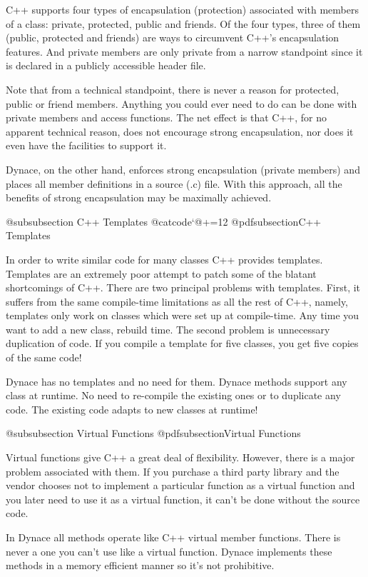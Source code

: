 C++ supports four types of encapsulation (protection) associated with
members of a class: private, protected, public and friends.  Of the
four types, three of them (public, protected and friends) are ways
to circumvent C++'s encapsulation features.  And private members are
only private from a narrow standpoint since it is declared in a
publicly accessible header file.

Note that from a technical standpoint, there is never a reason for
protected, public or friend members.  Anything you could ever need
to do can be done with private members and access functions.  The
net effect is that C++, for no apparent technical reason, does
not encourage strong encapsulation, nor does it even have the facilities
to support it.

Dynace, on the other hand, enforces strong encapsulation (private members)
and places all member definitions in a source (.c) file.  With this
approach, all the benefits of strong encapsulation may be maximally
achieved.


@subsubsection C++ Templates
{@catcode`@+=12 @pdfsubsection{C++ Templates}}

In order to write similar code for many classes C++ provides
templates.  Templates are an extremely poor attempt to patch some
of the blatant shortcomings of C++.  There are two principal problems
with templates.  First, it suffers from the same compile-time limitations
as all the rest of C++, namely, templates only work on classes which
were set up at compile-time.  Any time you want to add a new class,
rebuild time.  The second problem is unnecessary duplication of code.
If you compile a template for five classes, you get five copies of the
same code!

Dynace has no templates and no need for them.  Dynace methods support any
class at runtime.  No need to re-compile the existing ones or to
duplicate any code.  The existing code adapts to new classes at
runtime!

@subsubsection Virtual Functions
@pdfsubsection{Virtual Functions}

Virtual functions give C++ a great deal of flexibility.  However,
there is a major problem associated with them.  If you purchase a
third party library and the vendor chooses not to implement a
particular function as a virtual function and you later need to use it
as a virtual function, it can't be done without the source code.

In Dynace all methods operate like C++ virtual member functions.  There
is never a one you can't use like a virtual function.  Dynace implements
these methods in a memory efficient manner so it's not prohibitive.

